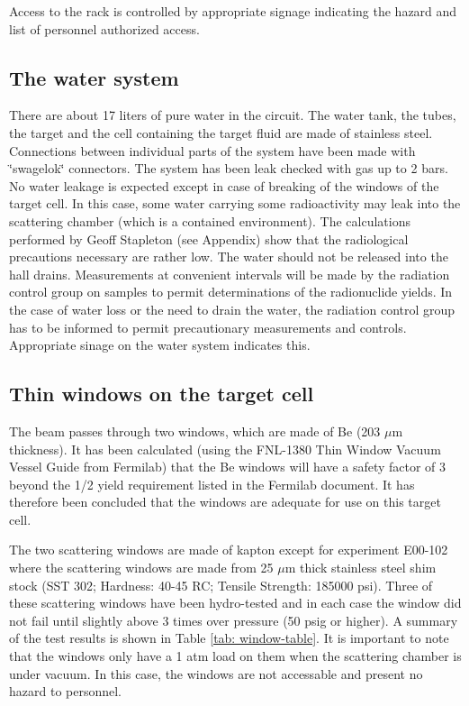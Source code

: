 Access to the rack is controlled by appropriate signage indicating
the hazard and list of personnel authorized access.


\subsection{The water system}

There are about 17 liters of pure water in the circuit. The water
tank, the tubes, the target and the cell containing the target fluid
are made of stainless steel. Connections between individual parts
of the system have been made with \char`\"{}swagelok\char`\"{} connectors.
The system has been leak checked with gas up to 2 bars. No water leakage
is expected except in case of breaking of the windows of the target
cell. In this case, some water carrying some radioactivity may leak
into the scattering chamber (which is a contained environment). The
calculations performed by Geoff Stapleton (see Appendix) show that
the radiological precautions necessary are rather low. The water should
not be released into the hall drains. Measurements at convenient intervals
will be made by the radiation control group on samples to permit determinations
of the radionuclide yields. In the case of water loss or the need
to drain the water, the radiation control group has to be informed
to permit precautionary measurements and controls. Appropriate sinage
on the water system indicates this.


\subsection{Thin windows on the target cell}

The beam passes through two windows, which are made of Be (203 $\mu $m
thickness). It has been calculated (using the FNL-1380 Thin Window
Vacuum Vessel Guide from Fermilab) that the Be windows will have a
safety factor of 3 beyond the 1/2 yield requirement listed in the
Fermilab document. It has therefore been concluded that the windows
are adequate for use on this target cell.

The two scattering windows are made of kapton except for experiment
E00-102 where the scattering windows are made from 25 $\mu $m thick
stainless steel shim stock (SST 302; Hardness: 40-45 RC; Tensile Strength:
185000 psi). Three of these scattering windows have been hydro-tested
and in each case the window did not fail until slightly above 3 times
over pressure (50 psig or higher). A summary of the test results is
shown in Table \ref{tab: window-table}. It is important to note that
the windows only have a 1 atm load on them when the scattering chamber
is under vacuum. In this case, the windows are not accessable and
present no hazard to personnel.

